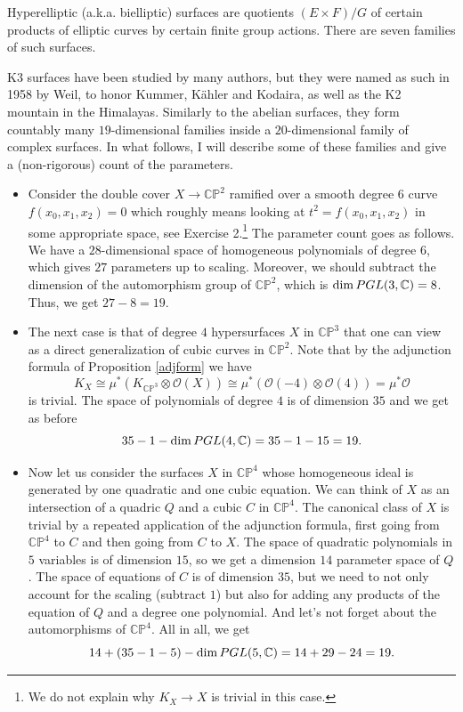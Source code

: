 \documentclass[11pt]{article}
\numberwithin{equation}{section}
\numberwithin{footnote}{section}
\renewcommand{\P}{{\mathbb P}}
\newcommand{\C}{{\mathbb C}}
\begin{document}
\smallskip 
Hyperelliptic (a.k.a. bielliptic) surfaces are quotients $(E\times F)/G$ of certain products of elliptic curves by certain finite group actions. There are seven families of such surfaces.

\smallskip 
K3 surfaces have been studied by many authors, but they were named as such in 1958 by Weil, to honor 
Kummer, K\"ahler and Kodaira, as well as the K2 mountain in the Himalayas. Similarly to the abelian surfaces, they form countably many $19$-dimensional families inside a $20$-dimensional family of  complex surfaces. In what follows, I will describe some of these families and give a (non-rigorous) count of the parameters. 

\smallskip 
\begin{itemize}
\item Consider the double cover $X\to \C\P^2$ ramified over a smooth degree $6$ curve $f(x_0,x_1,x_2)=0$ which roughly means looking at $t^2 = f(x_0,x_1,x_2)$ in some appropriate space, see Exercise 2.\footnote{ We do not explain why $K_X\to X$ is  trivial in this case.} The parameter count goes as follows. We have 
a $28$-dimensional space of homogeneous polynomials of degree $6$, which gives $27$ parameters up to scaling. Moreover, we should subtract the dimension of the automorphism group of $\C\P^2$, which is $\dim {\rm PGL}(3,\C)=8$.
Thus, we get $27-8=19$.

\item
The next case is that of degree $4$ hypersurfaces $X$ in $\C\P^3$ that one can view as a direct generalization of cubic curves in $\C\P^2$. Note that by the adjunction formula of Proposition \ref{adjform} we have
$$
K_X \cong \mu^*(K_{\C\P^3} \otimes \mathcal O(X)) \cong \mu^*(\mathcal O(-4)\otimes \mathcal O(4)) = \mu^*\mathcal O
$$
is trivial.
The space of polynomials of degree $4$ is of dimension $35$ and we get as before
$$
35 - 1 - \dim  {\rm PGL}(4,\C)= 35 -1 - 15 = 19.
$$

\item
Now let us consider the surfaces $X$ in $\C\P^4$ whose homogeneous ideal is generated by one quadratic and one cubic equation. We can think of $X$ as an intersection of a quadric $Q$ and a cubic $C$ in $\C\P^4$. The canonical class  of $X$ is trivial by a repeated application of the adjunction formula, first going from $\C\P^4$ to $C$ and then going from $C$ to $X$. The space of quadratic polynomials in $5$ variables is of dimension $15$, so we get a dimension $14$ parameter space of $Q$. The space of equations of $C$ is of dimension $35$, but we need to not only account for the scaling (subtract $1$) but also for adding any products of the equation of $Q$ and a degree one polynomial. And let's not forget about the automorphisms of $\C\P^4$. All in all, we get
$$
14 + (35 - 1 - 5) - \dim  {\rm PGL}(5,\C) = 14 + 29 - 24 = 19.
$$
\end{itemize}
\end{document}
